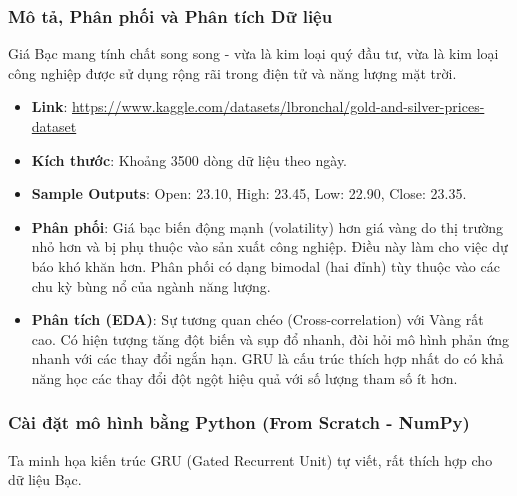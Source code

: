 \documentclass[12pt,a4paper]{article}
\begin{document}
\subsubsection{Mô tả, Phân phối và Phân tích Dữ liệu}
Giá Bạc mang tính chất song song - vừa là kim loại quý đầu tư, vừa là kim loại công nghiệp được sử dụng rộng rãi trong điện tử và năng lượng mặt trời.
\begin{itemize}
    \item \textbf{Link}: \url{https://www.kaggle.com/datasets/lbronchal/gold-and-silver-prices-dataset}
    \item \textbf{Kích thước}: Khoảng 3500 dòng dữ liệu theo ngày.
    \item \textbf{Sample Outputs}: Open: 23.10, High: 23.45, Low: 22.90, Close: 23.35.
    \item \textbf{Phân phối}: Giá bạc biến động mạnh (volatility) hơn giá vàng do thị trường nhỏ hơn và bị phụ thuộc vào sản xuất công nghiệp. Điều này làm cho việc dự báo khó khăn hơn. Phân phối có dạng bimodal (hai đỉnh) tùy thuộc vào các chu kỳ bùng nổ của ngành năng lượng.
    \item \textbf{Phân tích (EDA)}: Sự tương quan chéo (Cross-correlation) với Vàng rất cao. Có hiện tượng tăng đột biến và sụp đổ nhanh, đòi hỏi mô hình phản ứng nhanh với các thay đổi ngắn hạn. GRU là cấu trúc thích hợp nhất do có khả năng học các thay đổi đột ngột hiệu quả với số lượng tham số ít hơn.
\end{itemize}

\subsubsection{Cài đặt mô hình bằng Python (From Scratch - NumPy)}
Ta minh họa kiến trúc GRU (Gated Recurrent Unit) tự viết, rất thích hợp cho dữ liệu Bạc.
\end{document}
